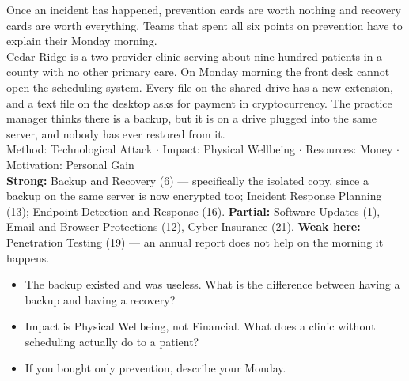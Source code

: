  Once an incident has happened, prevention cards are worth
nothing and recovery cards are worth everything. Teams that spent all six points
on prevention have to explain their Monday morning.\\
 Cedar Ridge is a two-provider clinic serving about nine hundred
patients in a county with no other primary care. On Monday morning the front
desk cannot open the scheduling system. Every file on the shared drive has a new
extension, and a text file on the desktop asks for payment in cryptocurrency.
The practice manager thinks there is a backup, but it is on a drive plugged into
the same server, and nobody has ever restored from it.\\
 Method: Technological Attack $\cdot$ Impact: Physical
Wellbeing $\cdot$ Resources: Money $\cdot$ Motivation: Personal Gain\\
 \textbf{Strong:} Backup and Recovery (6) --- specifically the
isolated copy, since a backup on the same server is now encrypted too;
Incident Response Planning (13); Endpoint Detection and Response (16).
\textbf{Partial:} Software Updates (1), Email and Browser Protections (12),
Cyber Insurance (21). \textbf{Weak here:} Penetration Testing (19) --- an annual
report does not help on the morning it happens.\\
\begin{itemize}
\item The backup existed and was useless. What is the difference between having
a backup and having a recovery?
\item Impact is Physical Wellbeing, not Financial. What does a clinic without
scheduling actually do to a patient?
\item If you bought only prevention, describe your Monday.
\end{itemize}

